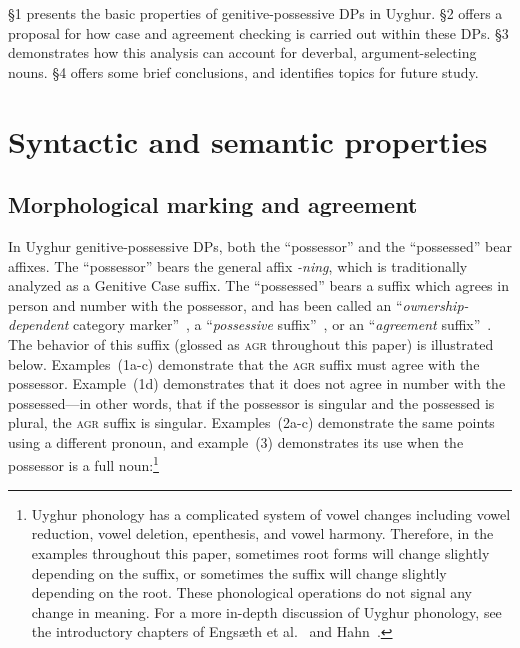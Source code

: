 \documentclass[letterpaper,12pt]{article}
\newcommand{\posst}{\textsc{agr}}
\begin{document}
\S 1 presents the basic properties of genitive-possessive DPs in Uyghur.
\S 2 offers a  proposal for how case and agreement checking is carried out within these DPs.
\S 3 demonstrates how this analysis can account for deverbal, argument-selecting nouns.
\S 4 offers some brief conclusions, and identifies topics for future study.

\section{Syntactic and semantic properties}
\subsection{Morphological marking and agreement}
In Uyghur genitive-possessive DPs, both the ``possessor'' and the ``possessed'' bear affixes. The ``possessor'' bears the general affix \textsl{-ning}, which is traditionally analyzed as a Genitive Case suffix. The ``possessed'' bears a suffix which agrees in person and number with the possessor, and has been called an ``\textit{ownership-dependent} category marker''~\cite[p. 51]{Tomur}, a ``\textit{possessive} suffix''~\cite[p. 26]{deJong,Dede}, or an ``\textit{agreement} suffix''~\cite[p. 243]{vandeCraats}. The
behavior of this suffix (glossed as \posst{} throughout this paper) is illustrated below. Examples~(1a-c) demonstrate that the \posst{} suffix must agree with the possessor.
Example~(1d) demonstrates that it does not agree in number with the possessed---in other words, that if the possessor is singular and the possessed is plural, the
\posst{} suffix is singular. Examples~(2a-c) demonstrate the same points using a different pronoun, and example~(3) demonstrates its use when the possessor is a full
noun:\footnote{Uyghur phonology has a complicated system of vowel changes including vowel reduction, vowel deletion, epenthesis, and vowel harmony. Therefore, in the examples throughout this paper, sometimes root forms will change slightly depending on the suffix, or sometimes the suffix will change slightly depending on the root. These phonological operations do not signal any change in meaning. For a more in-depth discussion of Uyghur phonology, see the introductory chapters of Engs\ae{}th et al.~\citeyear{Engetal} and Hahn~\citeyear{Hahn}.}
\end{document}
